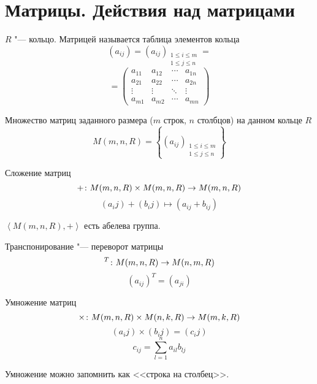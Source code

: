 \section{Матрицы. Действия над матрицами}

\begin{Def}
$R$ "--- кольцо. Матрицей называется таблица элементов кольца
$$(a_{ij}) = (a_{ij})_{\substack{1 \leqslant i \leqslant m \\ 1 \leqslant j \leqslant n}} = $$
$$ = \left(\begin{matrix}
a_{11} & a_{12} & \cdots & a_{1n} \\
a_{21} & a_{22} & \cdots & a_{2n} \\
\vdots & \vdots & \ddots & \vdots \\
a_{m1} & a_{m2} & \cdots & a_{mn}
\end{matrix}\right)$$
\end{Def}

\begin{Def}
Множество матриц заданного размера ($m$ строк, $n$ столбцов) на данном кольце $R$
$$M(m, n, R) = \left\{(a_{ij})_{\substack{1 \leqslant i \leqslant m \\ 1 \leqslant j \leqslant n}}\right\}$$
\end{Def}

\begin{Def}
Сложение матриц
$$+\colon M(m, n, R) \times M(m, n, R) \rightarrow M(m, n, R)$$
$$(a_ij) + (b_ij) \mapsto (a_{ij} + b_{ij})$$
\end{Def}

\begin{lemma}
$\left<M(m, n, R), +\right>$ есть абелева группа.
\end{lemma}

\begin{Def}
Транспонирование "--- переворот матрицы
$${}^T\colon M(m, n, R) \rightarrow M(n, m, R)$$
$$(a_{ij})^T = (a_{ji})$$
\end{Def}

\begin{Def}
Умножение матриц
$$\times\colon M(m, n, R) \times M(n, k, R) \rightarrow M(m, k, R)$$
$$(a_ij) \times (b_ij) = (c_ij)$$
$$c_{ij} = \sum_{l=1}^{n} a_{il}b_{lj}$$
\end{Def}

Умножение можно запомнить как <<строка на столбец>>.

